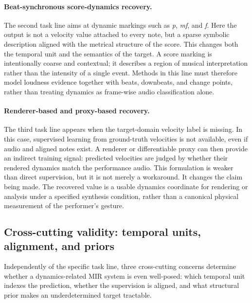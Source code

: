\paragraph{Beat-synchronous score-dynamics recovery.}
The second task line aims at dynamic markings such as \emph{p}, \emph{mf}, and \emph{f}. Here the output is not a velocity value attached to every note, but a sparse symbolic description aligned with the metrical structure of the score. This changes both the temporal unit and the semantics of the target. A score marking is intentionally coarse and contextual; it describes a region of musical interpretation rather than the intensity of a single event. Methods in this line must therefore model loudness evidence together with beats, downbeats, and change points, rather than treating dynamics as frame-wise audio classification alone.

\paragraph{Renderer-based and proxy-based recovery.}
The third task line appears when the target-domain velocity label is missing. In this case, supervised learning from ground-truth velocities is not available, even if audio and aligned notes exist. A renderer or differentiable proxy can then provide an indirect training signal: predicted velocities are judged by whether their rendered dynamics match the performance audio. This formulation is weaker than direct supervision, but it is not merely a workaround. It changes the claim being made. The recovered value is a usable dynamics coordinate for rendering or analysis under a specified synthesis condition, rather than a canonical physical measurement of the performer's gesture.

\subsection{Cross-cutting validity: temporal units, alignment, and priors}
\label{sec:bg:expressive_mir:validity}

Independently of the specific task line, three cross-cutting concerns determine whether a dynamics-related MIR system is even well-posed: which temporal unit indexes the prediction, whether the supervision is aligned, and what structural prior makes an underdetermined target tractable.

